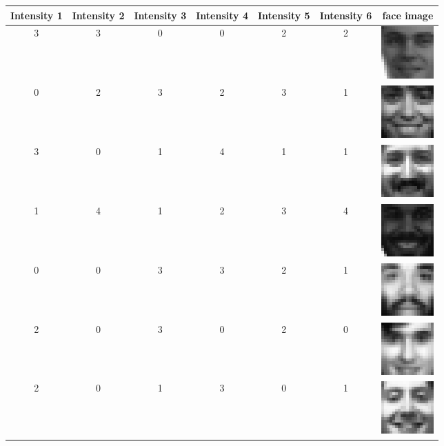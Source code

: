 \begin{itemize}
\small{
\begin{longtable}{c|c|c|c|c|c|c}
\textbf{Intensity 1} & \textbf{Intensity 2}  & \textbf{Intensity 3}  &  \textbf{Intensity 4} & \textbf{Intensity 5}&  \textbf{Intensity 6} & \textbf{face image} \\
\hline
3 & 3 & 0 & 0 & 2 & 2 &  \includegraphics{FacesDay1/figs/face0015.png} \\
\hline
0 & 2 & 3 & 2 & 3 & 1 &   \includegraphics{FacesDay1/figs/face0400.png} \\
\hline
3 & 0 & 1 & 4 & 1 & 1 & \includegraphics{FacesDay1/figs/face1000.png} \\
\hline
1 & 4 & 1 & 2 & 3 & 4 &  \includegraphics{FacesDay1/figs/face0600.png} \\
\hline
0 & 0 & 3 & 3 & 2 & 1 &  \includegraphics{FacesDay1/figs/face2300.png} \\
\hline
2 & 0 & 3 & 0 & 2 & 0 &  \includegraphics{FacesDay1/figs/face1030.png} \\
\hline
2 & 0 & 1 & 3 & 0 & 1 &  \includegraphics{FacesDay1/figs/face1270.png} \\

\end{longtable}}
\end{itemize}
